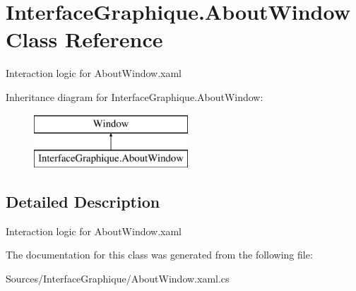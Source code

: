 \hypertarget{class_interface_graphique_1_1_about_window}{}\section{Interface\+Graphique.\+About\+Window Class Reference}
\label{class_interface_graphique_1_1_about_window}


Interaction logic for About\+Window.\+xaml  


Inheritance diagram for Interface\+Graphique.\+About\+Window\+:\begin{figure}[H]
\begin{center}
\leavevmode
\includegraphics[height=2.000000cm]{class_interface_graphique_1_1_about_window}
\end{center}
\end{figure}


\subsection{Detailed Description}
Interaction logic for About\+Window.\+xaml 



The documentation for this class was generated from the following file\+:\begin{DoxyCompactItemize}
\item 
Sources/\+Interface\+Graphique/About\+Window.\+xaml.\+cs\end{DoxyCompactItemize}
